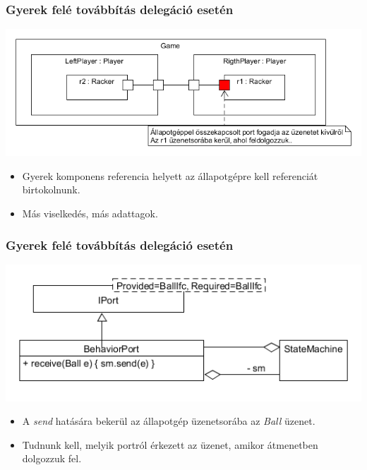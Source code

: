 \documentclass[11pt]{beamer}
\begin{document}
\begin{frame}
	\frametitle{Gyerek felé továbbítás delegáció esetén}
	\begin{center}
	\includegraphics[scale=0.5]{vedes_demo_class_recived.png}
	\end{center}
	\begin{itemize}
	\item Gyerek komponens referencia helyett az állapotgépre kell referenciát birtokolnunk. 
	\item Más viselkedés, más adattagok.
	\end{itemize}
\end{frame}

\begin{frame}
	\frametitle{Gyerek felé továbbítás delegáció esetén}
	\begin{center}
	\includegraphics[scale=0.5]{vedes_demo_behav_port.png}
	\end{center}
	\begin{itemize}
	\item A \textit{send} hatására bekerül az állapotgép üzenetsorába az \textit{Ball} üzenet.
	\item Tudnunk kell, melyik portról érkezett az üzenet, amikor átmenetben dolgozzuk fel.
	\end{itemize}
\end{frame}
\end{document}
